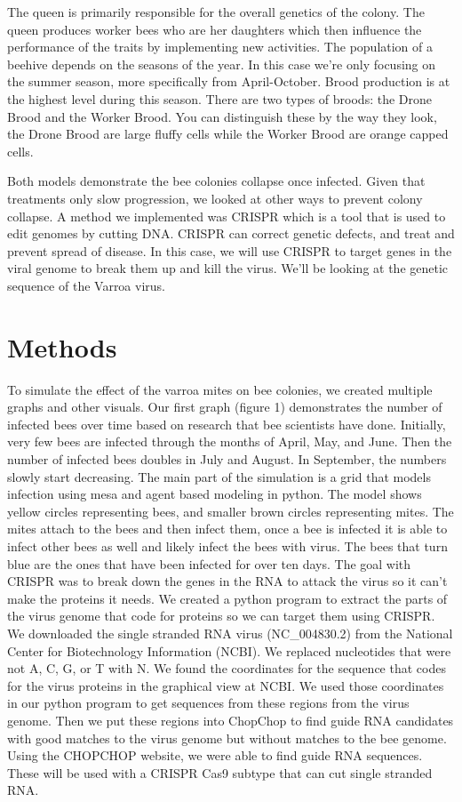 \documentclass[final,5p,times,twocolumn,authoryear]{elsarticle}
\begin{document}
The queen is primarily responsible for the overall genetics of the colony. The queen produces worker bees who are her daughters which then influence the performance of the traits by implementing new activities. The population of a beehive depends on the seasons of the year. In this case we’re only focusing on the summer season, more specifically from April-October. Brood production is at the highest level during this season. There are two types of broods: the Drone Brood and the Worker Brood. You can distinguish these by the way they look, the Drone Brood are large fluffy cells while the Worker Brood are orange capped cells.

Both models demonstrate the bee colonies collapse once infected. Given that treatments only slow progression, we looked at other ways to prevent colony collapse. A method we implemented was CRISPR which is a tool that is used to edit genomes by cutting DNA. CRISPR can correct genetic defects, and treat and prevent spread of disease. In this case, we will use CRISPR to target genes in the viral genome to break them up and kill the virus. We’ll be looking at the genetic sequence of the Varroa virus.


\section{Methods}
\label{Methods}
To simulate the effect of the varroa mites on bee colonies, we created multiple graphs and other visuals. Our first graph (figure 1)  demonstrates the number of infected bees over time based on research that bee scientists have done. Initially, very few bees are infected through the months of April, May, and June. Then the number of infected bees doubles in July and August. In September, the numbers slowly start decreasing. The main part of the simulation is a grid that models infection using mesa and agent based modeling in python. The model shows yellow circles representing bees, and smaller brown circles representing mites. The mites attach to the bees and then infect them, once a bee is infected it is able to infect other bees as well and likely infect the bees with virus. The bees that turn blue are the ones that have been infected for over ten days. 
The goal with CRISPR was to break down the genes in the RNA to attack the virus so it can’t make the proteins it needs. We created a python program to extract the parts of the virus genome that code for proteins so we can target them using CRISPR. We downloaded the single stranded RNA virus (NC\_004830.2) from the National Center for Biotechnology Information (NCBI). We replaced nucleotides that were not A, C, G, or T with N. We found the coordinates for the sequence that codes for the virus proteins in the graphical view at NCBI. We used those coordinates in our python program to get sequences from these regions from the virus genome. Then we put these regions into ChopChop to find guide RNA candidates with good matches to the virus genome but without matches to the bee genome. Using the CHOPCHOP website, we were able to find guide RNA sequences. These will be used with a CRISPR Cas9 subtype that can cut single stranded RNA.
\end{document}
